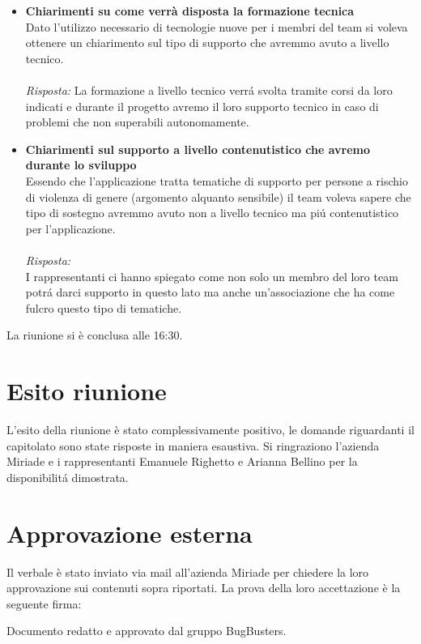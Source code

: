 \documentclass[a4paper,12pt]{article}
\begin{document}
\begin{itemize}
    \item \textbf{Chiarimenti su come verrà disposta la formazione tecnica}\\
    \noindent
    Dato l'utilizzo necessario di tecnologie nuove per i membri del team si voleva ottenere un chiarimento sul tipo di supporto che avremmo avuto a livello tecnico. \\ \\
    \textit{Risposta:} 
    La formazione a livello tecnico verrá svolta tramite corsi da loro indicati e durante il progetto avremo il loro supporto tecnico in caso di problemi che non superabili autonomamente.
    \vspace{1em}

    \item \textbf{Chiarimenti sul supporto a livello contenutistico che avremo durante lo sviluppo}\\
    \noindent
    Essendo che l'applicazione tratta tematiche di supporto per persone a rischio di violenza di genere (argomento alquanto sensibile) il team voleva sapere che tipo di sostegno avremmo avuto non a livello tecnico ma piú contenutistico per l'applicazione. \\ \\
    \textit{Risposta:} \\
    I rappresentanti ci hanno spiegato come non solo un membro del loro team potrá darci supporto in questo lato ma anche un'associazione che ha come fulcro questo tipo di tematiche.
    \vspace{1em}
\end{itemize}

La riunione si è conclusa alle 16:30.


\section{Esito riunione}
    L'esito della riunione è stato complessivamente positivo, le domande riguardanti il capitolato sono state risposte in maniera esaustiva. Si ringraziono l'azienda Miriade e i rappresentanti Emanuele Righetto e Arianna Bellino per la disponibilitá dimostrata.
    

\section{Approvazione esterna}
Il verbale è stato inviato via mail all'azienda Miriade per chiedere la loro approvazione sui contenuti sopra riportati. La prova della loro accettazione è la seguente firma:


\vfill
\begin{center}
    {\small\color{darkgray} Documento redatto e approvato dal gruppo BugBusters.}
\end{center}
\end{document}

